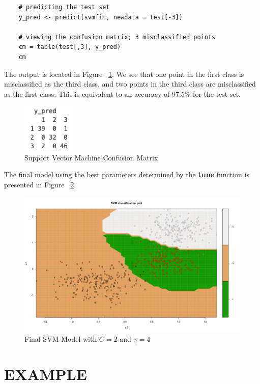 \documentclass[12pt]{article}
\begin{document}
\begin{verbatim}
    # predicting the test set
    y_pred <- predict(svmfit, newdata = test[-3])
    
    # viewing the confusion matrix; 3 misclassified points
    cm = table(test[,3], y_pred)
    cm
\end{verbatim}

The output is located in Figure ~\ref{fig_svm_cm}. We see that one point in the first class is misclassified as the third class, and two points in the third class are misclassified as the first class. This is equivalent to an accuracy of 97.5\% for the test set.

\begin{figure}[H]
    \centering
    \includegraphics[width=1in]{Figures/svm/svm_cm.png}
    \caption{Support Vector Machine Confusion Matrix}
    \label{fig_svm_cm}
\end{figure}

The final model using the best parameters determined by the \textbf{tune} function is presented in Figure ~\ref{fig_final_svm_model}.

\begin{figure}[H]
    \centering
    \includegraphics[width=5in]{Figures/svm/svm_final_model.png}
    \caption{Final SVM Model with \(C = 2\) and \(\gamma = 4\)}
    \label{fig_final_svm_model}
\end{figure}

\section{EXAMPLE}
\end{document}
